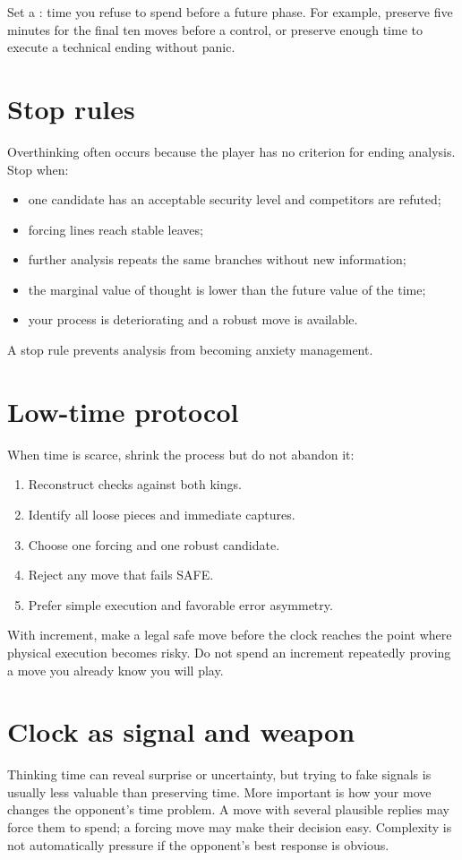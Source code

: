Set a : time you refuse to spend before a future phase. For example, preserve five minutes for the final ten moves before a control, or preserve enough time to execute a technical ending without panic.

\section{Stop rules}
Overthinking often occurs because the player has no criterion for ending analysis. Stop when:

\begin{itemize}[leftmargin=1.4em]
\item one candidate has an acceptable security level and competitors are refuted;
\item forcing lines reach stable leaves;
\item further analysis repeats the same branches without new information;
\item the marginal value of thought is lower than the future value of the time;
\item your process is deteriorating and a robust move is available.
\end{itemize}

A stop rule prevents analysis from becoming anxiety management.

\section{Low-time protocol}
When time is scarce, shrink the process but do not abandon it:

\begin{enumerate}[label=\textbf{\arabic*.},leftmargin=2em]
\item Reconstruct checks against both kings.
\item Identify all loose pieces and immediate captures.
\item Choose one forcing and one robust candidate.
\item Reject any move that fails SAFE.
\item Prefer simple execution and favorable error asymmetry.
\end{enumerate}

With increment, make a legal safe move before the clock reaches the point where physical execution becomes risky. Do not spend an increment repeatedly proving a move you already know you will play.

\section{Clock as signal and weapon}
Thinking time can reveal surprise or uncertainty, but trying to fake signals is usually less valuable than preserving time. More important is how your move changes the opponent's time problem. A move with several plausible replies may force them to spend; a forcing move may make their decision easy. Complexity is not automatically pressure if the opponent's best response is obvious.

